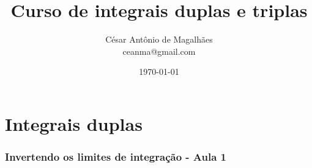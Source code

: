 \documentclass[12pt, a4paper]{article}
\title{Curso de integrais duplas e triplas}
\author{César Antônio de Magalhães \\ ceanma@gmail.com}
\date{\today}
\begin{document}
	\maketitle\newpage
	
	\tableofcontents\newpage
	
	
	\listoffigures\newpage
	
	
	\part{Integrais duplas}
	
		\section{Invertendo os limites de integração - Aula 1}			
\end{document}
